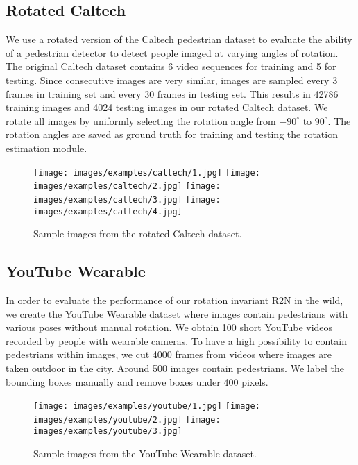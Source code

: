 \documentclass[10pt,twocolumn,letterpaper]{article}
\begin{document}
\subsection{Rotated Caltech} \label{sec:rot_caltech}

We use a rotated version of the Caltech pedestrian dataset to evaluate the ability of a pedestrian detector to detect people imaged at varying angles of rotation. The original Caltech dataset contains 6 video sequences for training and 5 for testing. Since consecutive images are very similar, images are sampled every 3 frames in training set and every 30 frames in testing set. This results in 42786 training images and 4024 testing images in our rotated Caltech dataset. We rotate all images by uniformly selecting the rotation angle from $-90^{\circ}$ to $90^{\circ}$. The rotation angles are saved as ground truth for training and testing the rotation estimation module.

\vspace{-0.2cm}
\begin{figure}[!h]
    \centering
    \texttt{[image: images/examples/caltech/1.jpg]}
    \texttt{[image: images/examples/caltech/2.jpg]}
    \texttt{[image: images/examples/caltech/3.jpg]}
    \texttt{[image: images/examples/caltech/4.jpg]}
    \caption{Sample images from the rotated Caltech dataset.}
    \label{fig:rotated_caltech_illustration}
    \vspace{-0.4cm}
\end{figure}

\subsection{YouTube Wearable}

In order to evaluate the performance of our rotation invariant R2N in the wild, we create the YouTube Wearable dataset where images contain pedestrians with various poses without manual rotation. We obtain 100 short YouTube videos recorded by people with wearable cameras. To have a high possibility to contain pedestrians within images, we cut 4000 frames from videos where images are taken outdoor in the city. Around 500 images contain pedestrians. We label the bounding boxes manually and remove boxes under 400 pixels.

\vspace{-0.2cm}
\begin{figure}[!h]
    \centering
    \texttt{[image: images/examples/youtube/1.jpg]}
    \texttt{[image: images/examples/youtube/2.jpg]}
    \texttt{[image: images/examples/youtube/3.jpg]}
    \caption{Sample images from the YouTube Wearable dataset.}
    \label{fig:youtube_illustration}
    \vspace{-0.4cm}
\end{figure}
\end{document}
